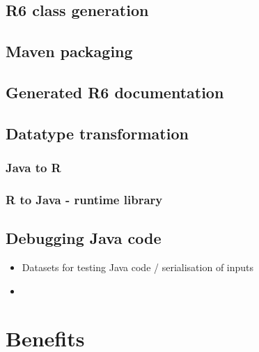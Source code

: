 \documentclass[
]{jss}
\begin{document}
\hypertarget{r6-class-generation}{%
\subsection{R6 class generation}\label{r6-class-generation}}

\hypertarget{maven-packaging}{%
\subsection{Maven packaging}\label{maven-packaging}}

\hypertarget{generated-r6-documentation}{%
\subsection{Generated R6
documentation}\label{generated-r6-documentation}}

\hypertarget{datatype-transformation}{%
\subsection{Datatype transformation}\label{datatype-transformation}}

\hypertarget{java-to-r}{%
\subsubsection{Java to R}\label{java-to-r}}

\hypertarget{r-to-java---runtime-library}{%
\subsubsection{R to Java - runtime
library}\label{r-to-java---runtime-library}}

\hypertarget{debugging-java-code}{%
\subsection{Debugging Java code}\label{debugging-java-code}}

\begin{itemize}
\item
  Datasets for testing Java code / serialisation of inputs
\item
\end{itemize}

\hypertarget{benefits}{%
\section{Benefits}\label{benefits}}
\end{document}
